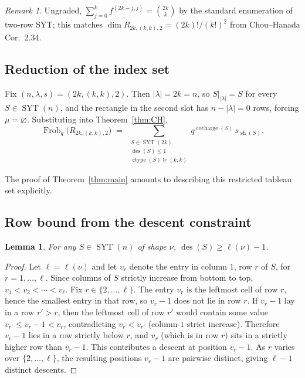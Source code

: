 \documentclass[11pt]{article}
\newtheorem{lemma}[theorem]{Lemma}
\theoremstyle{definition}
\theoremstyle{remark}
\newtheorem{remark}[theorem]{Remark}
\DeclareMathOperator{\Frob}{Frob}
\DeclareMathOperator{\ctype}{ctype}
\DeclareMathOperator{\cocharge}{cocharge}
\DeclareMathOperator{\des}{des}
\DeclareMathOperator{\sh}{sh}
\DeclareMathOperator{\SYT}{SYT}
\newcommand{\dom}{\trianglerighteq}
\begin{document}
\begin{remark}
Ungraded, $\sum_{j=0}^k f^{(2k-j,j)} = \binom{2k}{k}$ by the standard
enumeration of two-row SYT; this matches $\dim R_{2k,(k,k),2} = (2k)!/(k!)^2$
from Chou--Hanada Cor.~2.34.
\end{remark}

\subsection*{Reduction of the index set}

Fix $(n,\lambda,s) = (2k,(k,k),2)$. Then $|\lambda| = 2k = n$, so
$S|_{|\lambda|} = S$ for every $S \in \SYT(n)$, and the rectangle in the second
slot has $n - |\lambda| = 0$ rows, forcing $\mu = \varnothing$. Substituting
into Theorem~\ref{thm:CH},
\begin{equation}\label{eq:reduced}
    \Frob_q\bigl(R_{2k,(k,k),2}\bigr)
    \;=\; \sum_{\substack{S \in \SYT(2k)\\ \des(S) \le 1\\ \ctype(S) \dom (k,k)}}
        q^{\cocharge(S)}\, s_{\sh(S)}.
\end{equation}

The proof of Theorem~\ref{thm:main} amounts to describing this restricted
tableau set explicitly.

\subsection*{Row bound from the descent constraint}

\begin{lemma}\label{lem:row}
For any $S \in \SYT(n)$ of shape $\nu$, $\des(S) \ge \ell(\nu) - 1$.
\end{lemma}

\begin{proof}
Let $\ell = \ell(\nu)$ and let $v_r$ denote the entry in column $1$, row $r$
of $S$, for $r = 1, \ldots, \ell$. Since columns of $S$ strictly increase from
bottom to top, $v_1 < v_2 < \cdots < v_\ell$. Fix $r \in \{2, \ldots, \ell\}$.
The entry $v_r$ is the leftmost cell of row $r$, hence the smallest entry in
that row, so $v_r - 1$ does not lie in row $r$. If $v_r - 1$ lay in a row
$r' > r$, then the leftmost cell of row $r'$ would contain some value
$v_{r'} \le v_r - 1 < v_r$, contradicting $v_r < v_{r'}$ (column-$1$ strict
increase). Therefore $v_r - 1$ lies in a row strictly below $r$, and $v_r$
(which is in row $r$) sits in a strictly higher row than $v_r - 1$. This
contributes a descent at position $v_r - 1$. As $r$ varies over
$\{2,\ldots,\ell\}$, the resulting positions $v_r - 1$ are pairwise distinct,
giving $\ell - 1$ distinct descents.
\end{proof}
\end{document}
